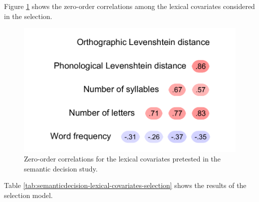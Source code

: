 \documentclass[
  12pt,
  man,floatsintext]{apa7}
\begin{document}
Figure \ref{fig:semanticdecision-lexical-covariates-correlations} shows the zero-order correlations among the lexical covariates considered in the selection.

\begin{figure}

{\centering \includegraphics[width=0.5\linewidth]{thesis-core_files/figure-latex/semanticdecision-lexical-covariates-correlations-1} 

}

\caption{Zero-order correlations for the lexical covariates pretested in the semantic decision study.}\label{fig:semanticdecision-lexical-covariates-correlations}
\end{figure}

Table \ref{tab:semanticdecision-lexical-covariates-selection} shows the results of the selection model.
\end{document}
